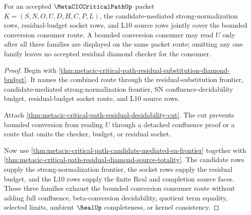 \begin{theorem}
\label{thm:metacic-critical-path-residual-diamond-candidate-budget-coverage}
For an accepted $\MetaCICCriticalPathUp$ packet $K=(S,N,O,U,D,H,C,P,L)$, the candidate-mediated strong-normalization rows, residual-budget socket rows, and L10 source rows jointly cover the bounded conversion consumer route. A bounded conversion consumer may read $U$ only after all three families are displayed on the same packet route; omitting any one family leaves no accepted residual diamond checker for the consumer.
\end{theorem}
\begin{proof}
Begin with \autoref{thm:metacic-critical-path-residual-substitution-diamond-budget}. It names the combined route through the residual-substitution frontier, candidate-mediated strong-normalization frontier, SN confluence-decidability budget, residual-budget socket route, and L10 source rows.

Attach \autoref{thm:metacic-critical-path-residual-decidability-cut}. The cut prevents bounded conversion from reading $U$ through a detached confluence proof or a route that omits the checker, budget, or residual socket.

Now use \autoref{thm:metacic-critical-path-candidate-mediated-sn-frontier} together with \autoref{thm:metacic-critical-path-residual-diamond-source-totality}. The candidate rows supply the strong-normalization frontier, the socket rows supply the residual budget, and the L10 rows supply the finite Real and completion source faces. These three families exhaust the bounded conversion consumer route without adding full confluence, beta-conversion decidability, quotient term equality, selected limits, ambient $\RealUp$ completeness, or kernel consistency.
\end{proof}


